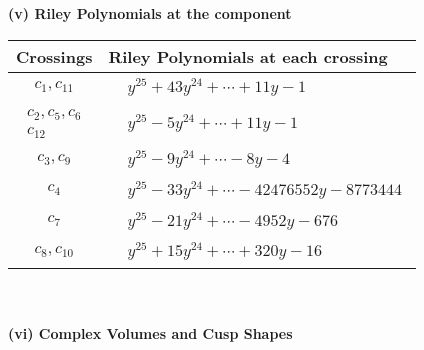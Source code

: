 \documentclass[1p]{elsarticle_modified}
\theoremstyle{definition}
\begin{document}
\newpage\renewcommand{\arraystretch}{1}
\flushleft \textbf{(v) Riley Polynomials at the component}\newline \\
\begin{tabular}{m{50pt}|m{274pt}}
Crossings & \hspace{64pt}Riley Polynomials at each crossing \\
\hline $$\begin{aligned}c_{1},c_{11}\end{aligned}$$&$\begin{aligned}
&y^{25}+43 y^{24}+\cdots+11 y-1
\end{aligned}$\\
\hline $$\begin{aligned}c_{2},c_{5},c_{6}\\c_{12}\end{aligned}$$&$\begin{aligned}
&y^{25}-5 y^{24}+\cdots+11 y-1
\end{aligned}$\\
\hline $$\begin{aligned}c_{3},c_{9}\end{aligned}$$&$\begin{aligned}
&y^{25}-9 y^{24}+\cdots-8 y-4
\end{aligned}$\\
\hline $$\begin{aligned}c_{4}\end{aligned}$$&$\begin{aligned}
&y^{25}-33 y^{24}+\cdots-42476552 y-8773444
\end{aligned}$\\
\hline $$\begin{aligned}c_{7}\end{aligned}$$&$\begin{aligned}
&y^{25}-21 y^{24}+\cdots-4952 y-676
\end{aligned}$\\
\hline $$\begin{aligned}c_{8},c_{10}\end{aligned}$$&$\begin{aligned}
&y^{25}+15 y^{24}+\cdots+320 y-16
\end{aligned}$\\
\hline
\end{tabular}\\~\\
\newpage\flushleft \textbf{(vi) Complex Volumes and Cusp Shapes}
\end{document}
